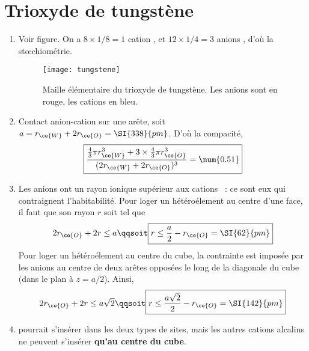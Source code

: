 \documentclass[a4paper, 12pt, final, garamond]{book}
\begin{document}
\section{Trioxyde de tungstène}
\begin{enumerate}
  \item Voir figure. On a $8\times1/8 = 1$ cation , et $12\times1/4 =
    3$ anions , d'où la stœchiométrie.
    \begin{figure}[h]
      \centering
      \texttt{[image: tungstene]}
      \caption{Maille élémentaire du trioxyde de tungstène. Les anions sont en
      rouge, les cations en bleu.}
      \label{fig:tung}
    \end{figure}
  \item Contact anion-cation sur une arête, soit $a = r_{\ce{W}} + 2r_{\ce{O}} =
    \SI{338}{pm}$. D'où la compacité,
    \[
      \boxed{
        \frac{
          \frac{4}{3}\pi r_{\ce{W}}^{3} + 3\times \frac{4}{3}\pi
            r_{\ce{O}}^{3}}{
          (2r_{\ce{W}} + 2r_{\ce{O}})^{3}
        }
        = \num{0.51}
      }
    \]
  \item Les anions  ont un rayon ionique supérieur aux cations
    ~: ce sont eux qui contraignent l'habitabilité. Pour loger un
    hétéroélement au centre d'une face, il faut que son rayon $r$ soit tel que
    \[
      2r_{\ce{O}} + 2r \leq a
      \qqsoit
      \boxed{r \leq \frac{a}{2} - r_{\ce{O}} = \SI{62}{pm}}
    \]
    Pour loger un hétéroélement au centre du cube, la contrainte est imposée par
    les anions au centre de deux arêtes opposées le long de la diagonale
    du cube (dans le plan à $z = a/2$). Ainsi,
    \[
      2r_{\ce{O}} + 2r \leq a \sqrt{2}
      \qqsoit
      \boxed{r \leq \frac{a \sqrt{2}}{2} - r_{\ce{O}} = \SI{142}{pm}}
    \]
  \item {} pourrait s'insérer dans les deux types de sites, mais les autres
    cations alcalins ne peuvent s'insérer \textbf{qu'au centre du cube}.
\end{enumerate}
\end{document}

